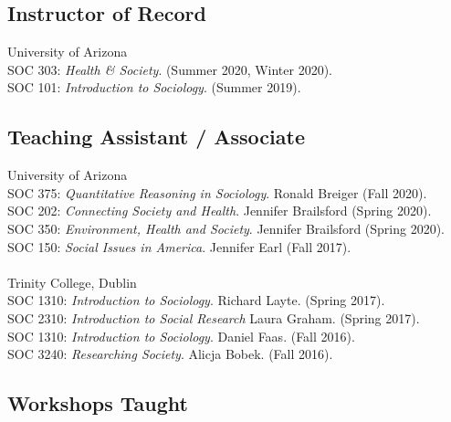 \subsection*{Instructor of Record}
University of Arizona \\
SOC 303: \emph{Health \& Society}. (Summer 2020, Winter 2020). \\
SOC 101: \emph{Introduction to Sociology}. (Summer 2019).


\begin{comment} 
SOC 101: \emph{Introduction to Sociology}. (Winter 2019). \\ 
SOC 280: \emph{Schools and Society}. (Summer 2018). \\ 
\end{comment}


\subsection*{Teaching Assistant / Associate}
University of Arizona \\
SOC 375: \emph{Quantitative Reasoning in Sociology}. Ronald Breiger (Fall 2020).\\
SOC 202: \emph{Connecting Society and Health}. Jennifer Brailsford (Spring 2020).\\
SOC 350: \emph{Environment, Health and Society}. Jennifer Brailsford (Spring 2020).\\
SOC 150: \emph{Social Issues in America}. Jennifer Earl (Fall 2017). \\
\\
Trinity College, Dublin \\
SOC 1310: \emph{Introduction to Sociology}. Richard Layte. (Spring 2017). \\
SOC 2310: \emph{Introduction to Social Research} Laura Graham. (Spring 2017). \\
SOC 1310: \emph{Introduction to Sociology}. Daniel Faas. (Fall 2016).\\
SOC 3240: \emph{Researching Society}. Alicja Bobek. (Fall 2016).


\subsection*{Workshops Taught}

